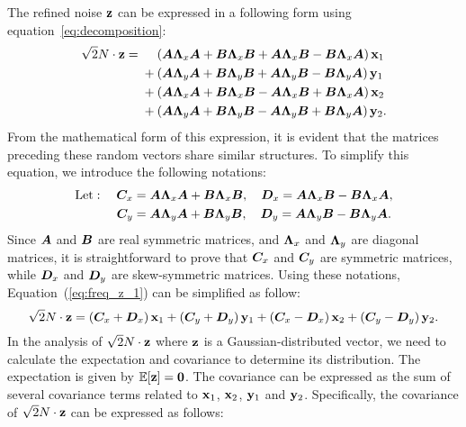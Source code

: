The refined noise $\mathbf{z}$ can be expressed in a following form using equation~\ref{eq:decomposition}:
\begin{equation}
\label{eq:freq_z_1}
\begin{split}
\sqrt{2}N\cdot\mathbf{z} {} = {}& \phantom{\;\;\,\,\,}\left( {\bm{A}}{\bm{\Lambda}}_x{\bm{A}} +{\bm{B}}{\bm{\Lambda}}_x{\bm{B}}+{\bm{A}}{\bm{\Lambda}}_x{\bm{B}}-{\bm{B}}{\bm{\Lambda}}_x{\bm{A}}\right)\mathbf{x}_1 \\
                          & + \left( {\bm{A}}{\bm{\Lambda}}_y{\bm{A}} +{\bm{B}}{\bm{\Lambda}}_y{\bm{B}}+{\bm{A}}{\bm{\Lambda}}_y{\bm{B}}-{\bm{B}}{\bm{\Lambda}}_y{\bm{A}}\right)\mathbf{y}_1 \\
                          & + \left( {\bm{A}}{\bm{\Lambda}}_x{\bm{A}} +{\bm{B}}{\bm{\Lambda}}_x{\bm{B}}-{\bm{A}}{\bm{\Lambda}}_x{\bm{B}}+{\bm{B}}{\bm{\Lambda}}_x{\bm{A}}\right)\mathbf{x}_2 \\
                          & + \left( {\bm{A}}{\bm{\Lambda}}_y{\bm{A}} +{\bm{B}}{\bm{\Lambda}}_y{\bm{B}}-{\bm{A}}{\bm{\Lambda}}_y{\bm{B}}+{\bm{B}}{\bm{\Lambda}}_y{\bm{A}}\right)\mathbf{y}_2.
\end{split}
\end{equation}
From the mathematical form of this expression, it is evident that the matrices preceding these random vectors share similar structures.
To simplify this equation, we introduce the following notations:
\begin{equation}
\begin{split}
    \text{Let}:\quad
    {\bm{C}}_x &= {\bm{A}}{\bm{\Lambda}}_x{\bm{A}} +{\bm{B}}{\bm{\Lambda}}_x{\bm{B}},\quad {\bm{D}}_x ={\bm{A}}{\bm{\Lambda}}_x{\bm{B}}-{\bm{B}}{\bm{\Lambda}}_x{\bm{A}}, \\
    {\bm{C}}_y &= {\bm{A}}{\bm{\Lambda}}_y{\bm{A}} +{\bm{B}}{\bm{\Lambda}}_y{\bm{B}},\quad {\bm{D}}_y ={\bm{A}}{\bm{\Lambda}}_y{\bm{B}}-{\bm{B}}{\bm{\Lambda}}_y{\bm{A}}.
\end{split}
\end{equation}
Since ${\bm{A}}$ and ${\bm{B}}$ are real symmetric matrices, and ${\bm{\Lambda}}_x$ and ${\bm{\Lambda}}_y$ are diagonal matrices, it is straightforward to prove that ${\bm{C}}_x$ and ${\bm{C}}_y$ are symmetric matrices, while ${\bm{D}}_x$ and ${\bm{D}}_y$ are skew-symmetric matrices. 
Using these notations, Equation~(\ref{eq:freq_z_1}) can be simplified as follow:
\begin{equation}
    \sqrt{2}N\cdot\mathbf{z} = \left({\bm{C}}_x+{\bm{D}}_x\right)\mathbf{x}_1+
    \left({\bm{C}}_y+{\bm{D}}_y\right)\mathbf{y}_1+
    \left({\bm{C}}_x-{\bm{D}}_x\right)\mathbf{x}_2+
    \left({\bm{C}}_y-{\bm{D}}_y\right)\mathbf{y}_2.
\end{equation}
In the analysis of $\sqrt{2}N\cdot\mathbf{z}$ where $\mathbf{z}$ is a Gaussian-distributed vector, we need to calculate the expectation and covariance to determine its distribution.
The expectation is given by $\mathbb{E}[\mathbf{z}] = \mathbf{0}$. 
The covariance can be expressed as the sum of several covariance terms related to  $\mathbf{x}_1$, $\mathbf{x}_2$, $\mathbf{y}_1$ and $\mathbf{y}_2$. Specifically, the covariance of $\sqrt{2}N\cdot\mathbf{z}$ can be expressed as follows:
